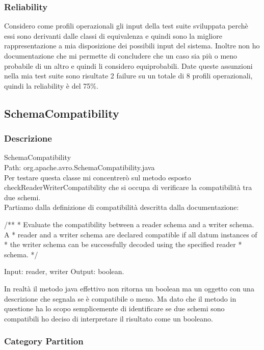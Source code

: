 \documentclass[12pt, a4paper]{article}
\begin{document}
\subsubsection{Reliability}
Considero come profili operazionali gli input della test suite sviluppata perchè essi sono derivanti dalle classi di equivalenza
e quindi sono la migliore rappresentazione a mia disposizione dei possibili input del sistema. Inoltre non ho documentazione che
mi permette di concludere che un caso sia più o meno probabile di un altro e quindi li considero equiprobabili. Date queste 
assunzioni nella mia test suite sono risultate 2 failure su un totale di 8 profili operazionali, quindi la reliability è del 75\%.
\subsection{SchemaCompatibility}

\subsubsection{Descrizione}

SchemaCompatibility \\
Path: org.apache.avro.SchemaCompatibility.java \\

Per testare questa classe mi concentrerò sul metodo esposto checkReaderWriterCompatibility che
si occupa di verificare la compatibilità tra due schemi. \\
Partiamo dalla definizione di compatibilità descritta dalla documentazione:


/** * Evaluate the compatibility between a reader schema and a writer schema. A
* reader and a writer schema are declared compatible if all datum instances of *
the writer schema can be successfully decoded using the specified reader *
schema. */

Input: reader, writer
Output: boolean. 


In realtà il metodo java effettivo non ritorna un boolean ma un oggetto con una descrizione che segnala se è 
compatibile o meno. Ma dato che il metodo in questione ha lo scopo semplicemente di identificare se due schemi sono compatibili
ho deciso di interpretare il risultato come un booleano.



\subsubsection{Category Partition}
\end{document}
